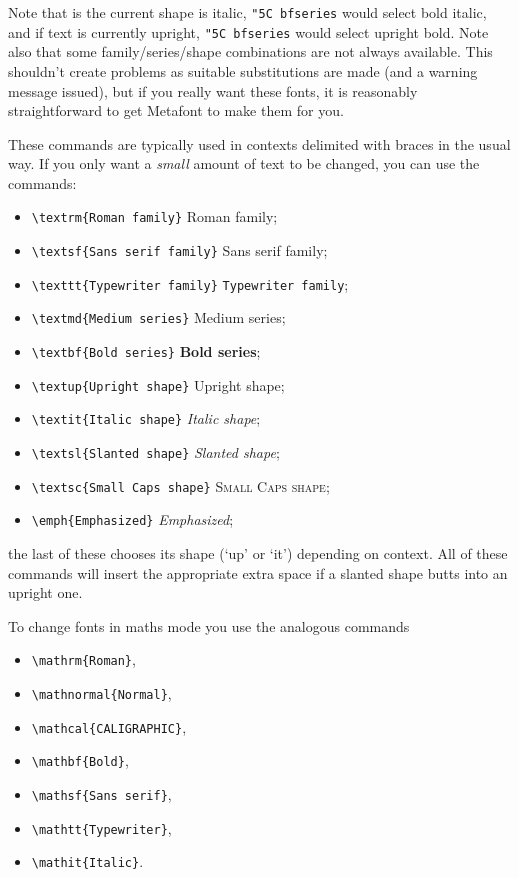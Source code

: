 \documentclass[11pt,a4paper]{article}
\newcommand{\cn}[1]{{\tt \char"5C #1}}
\begin{document}
Note that is the current shape is italic, \cn{bfseries} would
select bold italic, and if text is currently upright,
\cn{bfseries} would select upright bold.  Note also that some
family/series/shape combinations are not always available.
This shouldn't create problems as suitable substitutions are made
(and a warning message issued), but if you really want these
fonts, it is reasonably straightforward to get Metafont to make them
for you.

These commands are typically used in contexts delimited with braces
in the usual way.  If you only want a \textit{small} amount of text
to be changed, you can use the commands:
\begin{itemize}
\item \verb|\textrm{Roman family}| \textrm{Roman family};
\item \verb|\textsf{Sans serif family}| \textsf{Sans serif family};
\item \verb|\texttt{Typewriter family}| \texttt{Typewriter family};
\item \verb|\textmd{Medium series}| \textmd{Medium series};
\item \verb|\textbf{Bold series}| \textbf{Bold series};
\item \verb|\textup{Upright shape}| \textup{Upright shape};
\item \verb|\textit{Italic shape}| \textit{Italic shape};
\item \verb|\textsl{Slanted shape}| \textsl{Slanted shape};
\item \verb|\textsc{Small Caps shape}| \textsc{Small Caps shape};
\item \verb|\emph{Emphasized}| \emph{Emphasized};
\end{itemize}
the last of these chooses its shape (`up' or `it') depending on context.
All of these commands will insert the appropriate extra space
if a slanted shape butts into an upright one.

To change fonts in maths mode you use the analogous commands
\begin{itemize}
\item \verb|\mathrm{Roman}|,
\item \verb|\mathnormal{Normal}|,
\item \verb|\mathcal{CALIGRAPHIC}|,
\item \verb|\mathbf{Bold}|,
\item \verb|\mathsf{Sans serif}|,
\item \verb|\mathtt{Typewriter}|,
\item \verb|\mathit{Italic}|.
\end{itemize}
\end{document}

